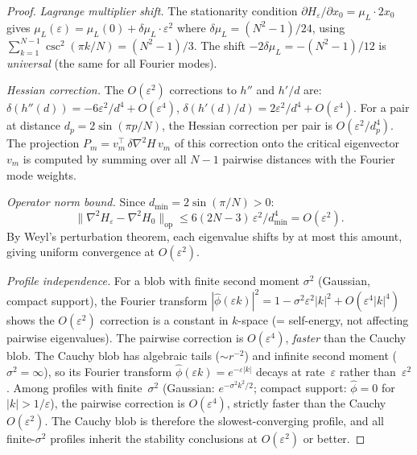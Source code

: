\begin{proof}
\emph{Lagrange multiplier shift.}  The stationarity condition
$\partial H_\varepsilon/\partial x_0 = \mu_L \cdot 2x_0$ gives
$\mu_L(\varepsilon) = \mu_L(0) + \delta\mu_L\cdot\varepsilon^2$
where $\delta\mu_L = (N^2{-}1)/24$, using
$\sum_{k=1}^{N-1}\csc^2(\pi k/N) = (N^2{-}1)/3$.  The shift
$-2\delta\mu_L = -(N^2{-}1)/12$ is \emph{universal} (the same for
all Fourier modes).

\emph{Hessian correction.}  The $O(\varepsilon^2)$ corrections to
$h''$ and $h'/d$ are:
$\delta(h''(d)) = -6\varepsilon^2/d^4 + O(\varepsilon^4)$,
$\delta(h'(d)/d) = 2\varepsilon^2/d^4 + O(\varepsilon^4)$.
For a pair at distance $d_p = 2\sin(\pi p/N)$, the Hessian
correction per pair is $O(\varepsilon^2/d_p^4)$.
The projection $P_m = v_m^\top\,\delta\nabla^2\!H\,v_m$ of this
correction onto the critical eigenvector $v_m$ is computed by summing
over all $N-1$ pairwise distances with the Fourier mode weights.

\emph{Operator norm bound.}  Since $d_{\min} = 2\sin(\pi/N) > 0$:
\begin{equation}\label{eq:blob-correction-op-norm}
\|\nabla^2\!H_\varepsilon - \nabla^2\!H_0\|_{\mathrm{op}}
\le 6(2N{-}3)\,\varepsilon^2/d_{\min}^4 = O(\varepsilon^2).
\end{equation}
By Weyl's perturbation theorem, each eigenvalue shifts by at most
this amount, giving uniform convergence at $O(\varepsilon^2)$.

\emph{Profile independence.}  For a blob with finite second moment
$\sigma^2$ (Gaussian, compact support), the Fourier transform
$|\hat\phi(\varepsilon k)|^2 = 1 - \sigma^2\varepsilon^2|k|^2
+ O(\varepsilon^4|k|^4)$
shows the $O(\varepsilon^2)$ correction is a constant in $k$-space
(= self-energy, not affecting pairwise eigenvalues).  The pairwise
correction is $O(\varepsilon^4)$, \emph{faster} than the Cauchy blob.
The Cauchy blob has algebraic tails ($\sim r^{-2}$)
and infinite second moment ($\sigma^2 = \infty$), so
its Fourier transform $\hat\phi(\varepsilon k)
= e^{-\varepsilon|k|}$ decays at rate~$\varepsilon$
rather than~$\varepsilon^2$.
Among profiles with finite~$\sigma^2$
(Gaussian: $e^{-\sigma^2 k^2/2}$;
compact support: $\hat\phi = 0$ for $|k| > 1/\varepsilon$),
the pairwise correction is $O(\varepsilon^4)$, strictly
faster than the Cauchy $O(\varepsilon^2)$.
The Cauchy blob is therefore the slowest-converging profile,
and all finite-$\sigma^2$ profiles inherit the stability
conclusions at $O(\varepsilon^2)$ or better.
\end{proof}

